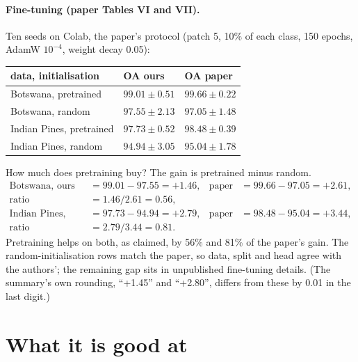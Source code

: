 \paragraph{Fine-tuning (paper Tables VI and VII).} Ten seeds on Colab, the paper's protocol (patch 5, 10\% of each class,
150 epochs, AdamW $10^{-4}$, weight decay 0.05):

\begin{center}\small
\begin{tabular}{@{}lll@{}}
\toprule
data, initialisation & OA ours & OA paper \\
\midrule
Botswana, pretrained & $99.01\pm0.51$ & $99.66\pm0.22$ \\
Botswana, random & $97.55\pm2.13$ & $97.05\pm1.48$ \\
Indian Pines, pretrained & $97.73\pm0.52$ & $98.48\pm0.39$ \\
Indian Pines, random & $94.94\pm3.05$ & $95.04\pm1.78$ \\
\bottomrule
\end{tabular}
\end{center}

\begin{worked}[label={we:hslwhat:gain}]{How much does pretraining buy?}
The gain is pretrained minus random.
\begin{align*}
\text{Botswana, ours} &= 99.01-97.55 = +1.46, & \text{paper} &= 99.66-97.05 = +2.61,\\
\text{ratio} &= 1.46/2.61 = 0.56,\\
\text{Indian Pines, ours} &= 97.73-94.94 = +2.79, & \text{paper} &= 98.48-95.04 = +3.44,\\
\text{ratio} &= 2.79/3.44 = 0.81 .
\end{align*}
Pretraining helps on both, as claimed, by 56\% and 81\% of the paper's gain\tagC. The random-initialisation rows match
the paper, so data, split and head agree with the authors'; the remaining gap sits in unpublished fine-tuning details.
(The summary's own rounding, ``+1.45'' and ``+2.80'', differs from these by 0.01 in the last digit.)
\end{worked}

\section{What it is good at}\label{sec:hslwhat:good}

